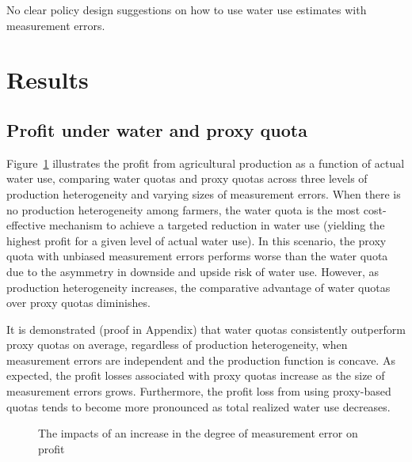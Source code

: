 \documentclass[
  letterpaper,
  DIV=11,
  numbers=noendperiod]{scrartcl}
\begin{document}
No clear policy design suggestions on how to use water use estimates
with measurement errors.

\section{Results}\label{results}

\subsection{Profit under water and proxy
quota}\label{profit-under-water-and-proxy-quota}

Figure~\ref{fig-profit-quota-water-het} illustrates the profit from
agricultural production as a function of actual water use, comparing
water quotas and proxy quotas across three levels of production
heterogeneity and varying sizes of measurement errors. When there is no
production heterogeneity among farmers, the water quota is the most
cost-effective mechanism to achieve a targeted reduction in water use
(yielding the highest profit for a given level of actual water use). In
this scenario, the proxy quota with unbiased measurement errors performs
worse than the water quota due to the asymmetry in downside and upside
risk of water use. However, as production heterogeneity increases, the
comparative advantage of water quotas over proxy quotas diminishes.

It is demonstrated (proof in Appendix) that water quotas consistently
outperform proxy quotas on average, regardless of production
heterogeneity, when measurement errors are independent and the
production function is concave. As expected, the profit losses
associated with proxy quotas increase as the size of measurement errors
grows. Furthermore, the profit loss from using proxy-based quotas tends
to become more pronounced as total realized water use decreases.

\begin{figure}[H]


\caption{\label{fig-profit-quota-water-het}The impacts of an increase in
the degree of measurement error on profit}

\end{figure}%
\end{document}
